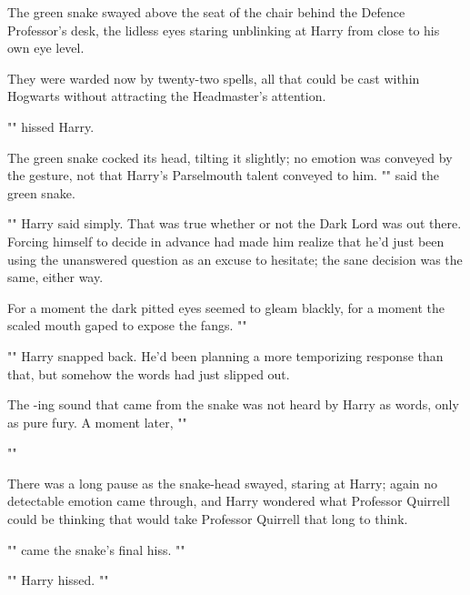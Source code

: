 The green snake swayed above the seat of the chair behind the Defence
Professor’s desk, the lidless eyes staring unblinking at Harry from close to
his own eye level.

They were warded now by twenty-two spells, all that could be cast within
Hogwarts without attracting the Headmaster’s attention.

"" hissed Harry.

The green snake cocked its head, tilting it slightly; no emotion was conveyed
by the gesture, not that Harry’s Parselmouth talent conveyed to him.
"" said the green snake.

"" Harry said simply. That was true whether or not the Dark
Lord was out there. Forcing himself to decide in advance had made him realize
that he’d just been using the unanswered question as an excuse to hesitate; the
sane decision was the same, either way.

For a moment the dark pitted eyes seemed to gleam blackly, for a moment the
scaled mouth gaped to expose the fangs. ""

"" Harry snapped back.
He’d been planning a more temporizing response than that, but somehow the words
had just slipped out.

The -ing sound that came from the snake was not heard by Harry as
words, only as pure fury. A moment later, ""

""

There was a long pause as the snake-head swayed, staring at Harry; again no
detectable emotion came through, and Harry wondered what Professor Quirrell
could be thinking that would take Professor Quirrell that long to think.

"" came the snake’s final
hiss. ""

"" Harry hissed. ""


